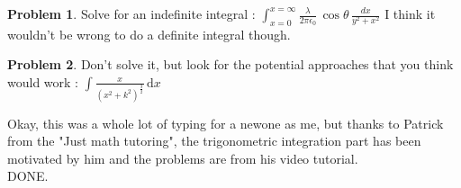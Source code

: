 \documentclass{article}
\theoremstyle{definition}
\newtheorem{prob}{\textsf{Problem}}[section]
\theoremstyle{definition}
\theoremstyle{definition}
\begin{document}
		\begin{prob}
		Solve for an indefinite integral : $ \int_{x=0} ^{x=\infty}
			\frac{\lambda}
			{2 \pi \epsilon_0} \, \cos\theta \, \frac{dx}{y^2 + x^2} $
			I think it wouldn't be wrong to do a definite integral though.
			\end{prob}

		\begin{prob}
Don't solve it, but look for the potential approaches that you think would work : $ \int \frac{x}
                                                                                                                                                                {	( x^2 + k^2) ^ {\frac{3}{2}} } \, \mathrm{d}x $
                                                                                                                                                                \end{prob}
                                                                                                                                                                
Okay, this was a whole lot of typing for a newone as me, but thanks to Patrick from the "Just math tutoring", the trigonometric integration part has been motivated by him and the problems are from his video tutorial.\\
DONE.
\end{document}
